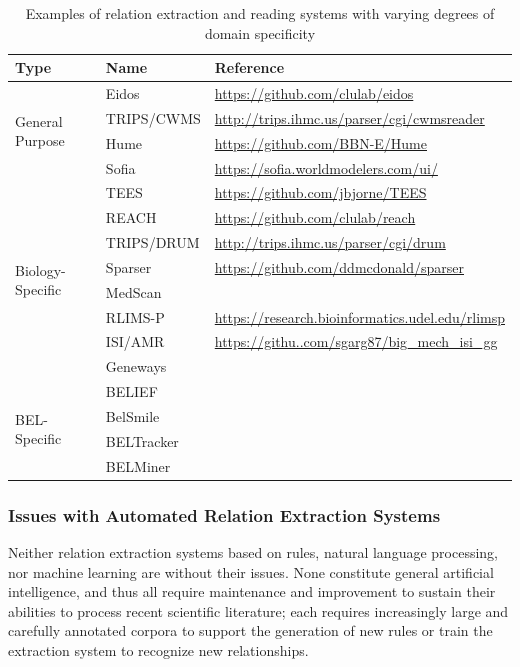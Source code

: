 \begin{table}
    \centering
    \begin{tabular}{ l l l }
        Type & Name & Reference \\
        \hline
        \multirow{4}{*}{General Purpose}
        & Eidos & \url{https://github.com/clulab/eidos} \\
        & TRIPS/CWMS & \url{http://trips.ihmc.us/parser/cgi/cwmsreader} \\
        & Hume & \url{https://github.com/BBN-E/Hume} \\
        & Sofia & \url{https://sofia.worldmodelers.com/ui/} \\
        \hline
        \multirow{8}{*}{Biology-Specific}
        & TEES & \url{https://github.com/jbjorne/TEES} \\
        & REACH & \url{https://github.com/clulab/reach} \\
        & TRIPS/DRUM & \url{http://trips.ihmc.us/parser/cgi/drum} \\
        & Sparser & \url{https://github.com/ddmcdonald/sparser} \\
        & MedScan &\cite{Novichkova2003} \\
        & RLIMS-P & \url{https://research.bioinformatics.udel.edu/rlimsp}  \\
        & ISI/AMR & \url{https://githu..com/sgarg87/big_mech_isi_gg} \\
        & Geneways &\cite{Rzhetsky2004} \\
        \hline
        \multirow{4}{*}{\ac{BEL}-Specific}
        & BELIEF &\cite{Madan2016} \\
        & BelSmile &\cite{Lai2016} \\
        & BELTracker &\cite{Rastegar-Mojarad2016} \\
        & BELMiner &\cite{Ravikumar2017} \\
    \end{tabular}
    \caption{Examples of relation extraction and reading systems with varying degrees of domain specificity}
    \label{tab:relation_extraction_systems}
\end{table}

\subsubsection{Issues with Automated Relation Extraction Systems}

Neither relation extraction systems based on rules, natural language processing, nor machine learning are without their issues.
None constitute general artificial intelligence, and thus all require maintenance and improvement to sustain their abilities to process recent scientific literature; each requires increasingly large and carefully annotated corpora to support the generation of new rules or train the extraction system to recognize new relationships.

